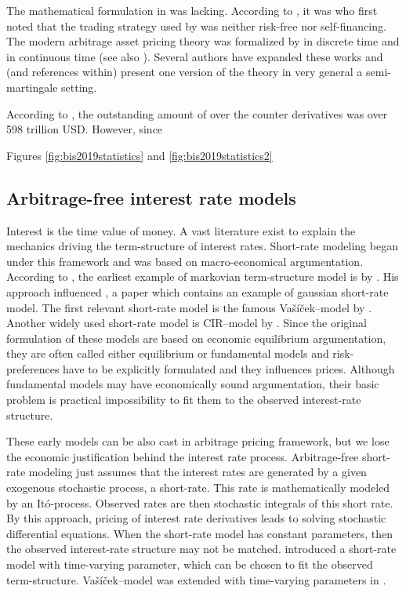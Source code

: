The mathematical formulation in \textcite{blackscholes1973pricing} was lacking. According to \textcite[p. 129]{musielarutkowski2005martingale}, it was \textcite{bergman1982pricing} who first noted that the trading strategy used by \textcite{blackscholes1973pricing} was neither risk-free nor self-financing. The modern arbitrage asset pricing theory was formalized by \textcite{harrisonkreps1979martingales} in discrete time and \textcite{harrisonpliska1981martingales} in continuous time (see also \textcite{harrisonpliska1983stochastic}). Several authors have expanded these works and \textcite{delbaenschachermayer1998fundamental} (and references within) present one version of the theory in very general a semi-martingale setting. 

According to \textcite{bis2019statistics}, the outstanding amount of over the counter derivatives was over 598 trillion USD. However, since 

Figures \ref{fig:bis2019statistics} and \ref{fig:bis2019statistics2}

\subsection{Arbitrage-free interest rate models}

Interest is the time value of money. A vast literature exist to explain the mechanics driving the term-structure of interest rates. Short-rate modeling began under this framework and was based on macro-economical argumentation. According to \textcite[p. 161]{duffie2010dynamic}, the earliest example of markovian term-structure model is by \textcite{pye1966markov}. His approach influenced \textcite{merton1974pricing}, a paper which contains an example of gaussian short-rate model. The first relevant short-rate model is the famous Va\v{s}\'{i}\v{c}ek--model by \textcite{vasicek1977equilibrium}. Another widely used short-rate model is CIR--model by \textcite{coxingersollross1985theory}. Since the original formulation of these models are based on economic equilibrium argumentation, they are often called either equilibrium or fundamental models and risk-preferences have to be explicitly formulated and they influences prices. Although fundamental models may have economically sound argumentation, their basic problem is practical impossibility to fit them to the observed interest-rate structure.

These early models can be also cast in arbitrage pricing framework, but we lose the economic justification behind the interest rate process. Arbitrage-free short-rate modeling just assumes that the interest rates are generated by a given exogenous stochastic process, a short-rate. This rate is mathematically modeled by an It\'{o}-process. Observed rates are then stochastic integrals of this short rate. By this approach, pricing of interest rate derivatives leads to solving stochastic differential equations. When the short-rate model has constant parameters, then the observed interest-rate structure may not be matched. \textcite{ho1986term} introduced a short-rate model with time-varying parameter, which can be chosen to fit the observed term-structure. Va\v{s}\'{i}\v{c}ek--model was extended with time-varying parameters in  \textcite{hull1990pricing}.

